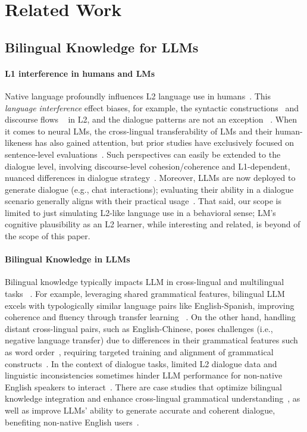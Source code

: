 \section{Related Work}
\label{sec:related-work}
\subsection{Bilingual Knowledge for LLMs}
\paragraph{L1 interference in humans and LMs} 
Native language profoundly influences L2 language use in humans~\cite{levenston1971over,Schachter1974-dq,Kleinmann1977-vt,brooke2013native}. This \textit{language interference} effect biases, for example, the syntactic constructions~\cite{felker2021role} and discourse flows ~\cite{bailey2021digital} in L2, and the dialogue patterns are not an exception ~\cite{veivo2025dialogue}.
When it comes to neural LMs, the cross-lingual transferability of LMs and their human-likeness has also gained attention, but prior studies have exclusively focused on sentence-level evaluations~\cite{oba-etal-2023-second,yadavalli-etal-2023-slabert,elshin2024general}. 
Such perspectives can easily be extended to the dialogue level, involving discourse-level cohesion/coherence and L1-dependent, nuanced differences in dialogue strategy~\cite{abe2019interactional,gao2024interaction}.
Moreover, LLMs are now deployed to generate dialogue (e.g., chat interactions); evaluating their ability in a dialogue scenario generally aligns with their practical usage~\cite{jin2024better,veivo2025dialogue}. That said, our scope is limited to just simulating L2-like language use in a behavioral sense; LM's cognitive plausibility as an L2 learner, while interesting and related, is beyond of the scope of this paper.

\paragraph{Bilingual Knowledge in LLMs}
Bilingual knowledge typically impacts LLM in cross-lingual and multilingual tasks ~\cite{miah2024multimodal}. 
For example, leveraging shared grammatical features, bilingual LLM excels with typologically similar language pairs like English-Spanish, improving coherence and fluency through transfer learning ~\cite{jeon2022information}. On the other hand, handling distant cross-lingual pairs, such as English-Chinese, poses challenges (i.e., negative language transfer) due to differences in their grammatical features such as word order~\cite{ranaldi2023does}, requiring targeted training and alignment of grammatical constructs~\cite{pvribavn2024comparative}. 
In the context of dialogue tasks, limited L2 dialogue data and linguistic inconsistencies sometimes hinder LLM performance for non-native English speakers to interact~\cite{gan2024clarq}. There are case studies that optimize bilingual knowledge integration and enhance cross-lingual grammatical understanding~\cite{huzaifah2024evaluating}, as well as improve LLMs' ability to generate accurate and coherent dialogue, benefiting non-native English users~\cite{han2024llm}.


